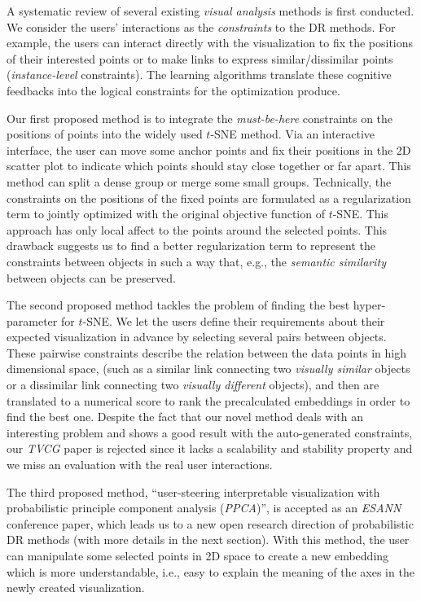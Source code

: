 \documentclass[11pt, a4paper]{article}
\begin{document}
A systematic review of several existing \emph{visual analysis} methods is first conducted.
We consider the users' interactions as the \emph{constraints} to the DR methods.
For example, the users can interact directly with the visualization to fix the positions of their interested points or to make links to express similar/dissimilar points (\emph{instance-level} constraints).
The learning algorithms translate these cognitive feedbacks into the logical constraints for the optimization produce.

Our first proposed method is to integrate the \emph{must-be-here} constraints on the positions of points into the widely used $t$-SNE method.
Via an interactive interface, the user can move some anchor points and fix their positions in the 2D scatter plot to indicate which points should stay close together or far apart.
This method can split a dense group or merge some small groups.
Technically, the constraints on the positions of the fixed points are formulated as a regularization term to jointly optimized with the original objective function of $t$-SNE.
This approach has only local affect to the points around the selected points.
This drawback suggests us to find a better regularization term to represent the constraints between objects in such a way that, e.g., the \emph{semantic similarity} between objects can be preserved.

The second proposed method tackles the problem of finding the best hyper-parameter for $t$-SNE.
We let the users define their requirements about their expected visualization in advance by selecting several pairs between objects.
These pairwise constraints describe the relation between the data points in high dimensional space, (such as a similar link connecting two \emph{visually similar} objects or a dissimilar link connecting two \emph{visually different} objects), and then are translated to a numerical score to rank the precalculated embeddings in order to find the best one.
Despite the fact that our novel method deals with an interesting problem and shows a good result with the auto-generated constraints, our \emph{TVCG} paper is rejected since it lacks a scalability and stability property and we miss an evaluation with the real user interactions.

The third proposed method, ``user-steering interpretable visualization with probabilistic principle component analysis (\emph{PPCA})'', is accepted as an \emph{ESANN} conference paper, which leads us to a new open research direction of probabilistic DR methods (with more details in the next section).
With this method, the user can manipulate some selected points in 2D space to create a new embedding which is more understandable, i.e., easy to explain the meaning of the axes in the newly created visualization.
\end{document}
